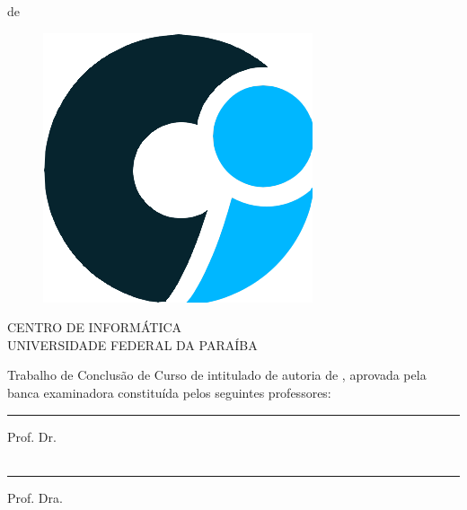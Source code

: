\documentclass{tcc}
\begin{document}
\vfill
\begin{center}
\MONTH de \the\year
\end{center}











\begin{figure}[H]
\centering
\includegraphics[width=0.12\linewidth]{imagens/logo_ci.png}
\end{figure}

\begin{center}
CENTRO DE INFORMÁTICA \\
UNIVERSIDADE FEDERAL DA PARAÍBA
\end{center}

\vspace{0.05in}

Trabalho de Conclusão de Curso de {\nomedocurso} intitulado \textit{\bf \em \thetitle} de autoria de \theauthor, aprovada pela banca examinadora constituída pelos seguintes professores: \\

\vspace{0.7in}

\hrule
\noindent Prof. Dr. \profa\\
\insta\\

\vspace{0.25in}

\hrule
\noindent Prof. Dra. \profb\\
\instb\\
\end{document}
